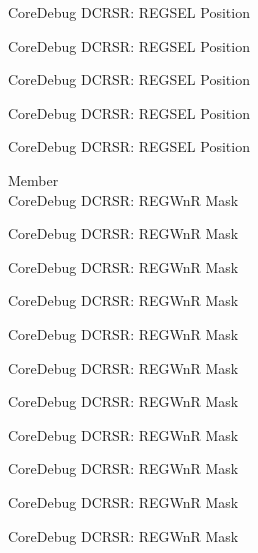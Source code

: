 \begin{DoxyRefList}
\label{deprecated__deprecated000929}%
%
Core\+Debug DCRSR\+: REGSEL Position 

\label{deprecated__deprecated000988}%
%
Core\+Debug DCRSR\+: REGSEL Position 

\label{deprecated__deprecated001064}%
%
Core\+Debug DCRSR\+: REGSEL Position 

\label{deprecated__deprecated001153}%
%
Core\+Debug DCRSR\+: REGSEL Position 

\label{deprecated__deprecated001255}%
%
Core\+Debug DCRSR\+: REGSEL Position  
\item[Member \doxylink{group___c_m_s_i_s___core_debug_ga1eef4992d8f84bc6c0dffed1c87f90a5}{Core\+Debug\+\_\+\+DCRSR\+\_\+\+REGWn\+R\+\_\+\+Msk} ]\hfill \\
\label{deprecated__deprecated000042}%
%
Core\+Debug DCRSR\+: REGWnR Mask 

\label{deprecated__deprecated000130}%
%
Core\+Debug DCRSR\+: REGWnR Mask 

\label{deprecated__deprecated000186}%
%
Core\+Debug DCRSR\+: REGWnR Mask 

\label{deprecated__deprecated000269}%
%
Core\+Debug DCRSR\+: REGWnR Mask 

\label{deprecated__deprecated000328}%
%
Core\+Debug DCRSR\+: REGWnR Mask 

\label{deprecated__deprecated000404}%
%
Core\+Debug DCRSR\+: REGWnR Mask 

\label{deprecated__deprecated000493}%
%
Core\+Debug DCRSR\+: REGWnR Mask 

\label{deprecated__deprecated000595}%
%
Core\+Debug DCRSR\+: REGWnR Mask 

\label{deprecated__deprecated000701}%
%
Core\+Debug DCRSR\+: REGWnR Mask 

\label{deprecated__deprecated000789}%
%
Core\+Debug DCRSR\+: REGWnR Mask 

\label{deprecated__deprecated000845}%
%
Core\+Debug DCRSR\+: REGWnR Mask 


\end{DoxyRefList}
